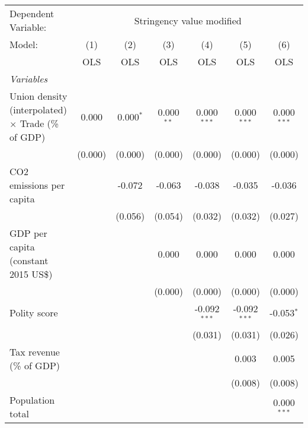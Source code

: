 
\begingroup
\centering
\begin{tabular}{lcccccc}
   \toprule
   Dependent Variable: & \multicolumn{6}{c}{Stringency value modified}\\
   Model:                                                    & (1)     & (2)         & (3)          & (4)            & (5)            & (6)\\  
                                                             &  OLS    & OLS         & OLS          & OLS            & OLS            & OLS\\  
   \midrule
   \emph{Variables}\\
   Union density (interpolated) $\times$ Trade (\% of GDP)   & 0.000   & 0.000$^{*}$ & 0.000$^{**}$ & 0.000$^{***}$  & 0.000$^{***}$  & 0.000$^{***}$\\   
                                                             & (0.000) & (0.000)     & (0.000)      & (0.000)        & (0.000)        & (0.000)\\   
   CO2 emissions per capita                                  &         & -0.072      & -0.063       & -0.038         & -0.035         & -0.036\\   
                                                             &         & (0.056)     & (0.054)      & (0.032)        & (0.032)        & (0.027)\\   
   GDP per capita (constant 2015 US\$)                       &         &             & 0.000        & 0.000          & 0.000          & 0.000\\   
                                                             &         &             & (0.000)      & (0.000)        & (0.000)        & (0.000)\\   
   Polity score                                              &         &             &              & -0.092$^{***}$ & -0.092$^{***}$ & -0.053$^{*}$\\   
                                                             &         &             &              & (0.031)        & (0.031)        & (0.026)\\   
   Tax revenue (\% of GDP)                                   &         &             &              &                & 0.003          & 0.005\\   
                                                             &         &             &              &                & (0.008)        & (0.008)\\   
   Population total                                          &         &             &              &                &                & 0.000$^{***}$\\   

\end{tabular}
